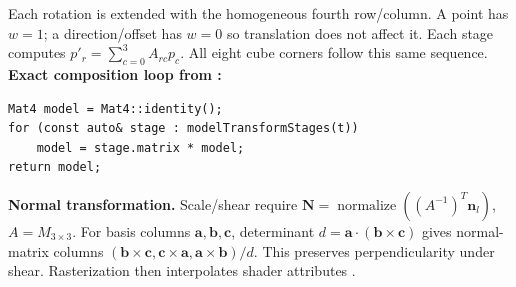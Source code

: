 Each rotation is extended with the homogeneous fourth row/column. A point has $w=1$; a direction/offset has $w=0$ so translation does not affect it. Each stage computes $p'_r=\sum_{c=0}^{3} A_{rc}p_c$. All eight cube corners follow this same sequence.
\textbf{Exact composition loop from :}
\begin{verbatim}
Mat4 model = Mat4::identity();
for (const auto& stage : modelTransformStages(t))
    model = stage.matrix * model;
return model;
\end{verbatim}
\textbf{Normal transformation.} Scale/shear require $\mathbf N=\operatorname{normalize}((A^{-1})^T\mathbf n_l)$, $A=M_{3\times3}$. For basis columns $\mathbf a,\mathbf b,\mathbf c$, determinant $d=\mathbf a\cdot(\mathbf b\times\mathbf c)$ gives normal-matrix columns $(\mathbf b\times\mathbf c,\mathbf c\times\mathbf a,\mathbf a\times\mathbf b)/d$. This preserves perpendicularity under shear. Rasterization then interpolates shader attributes \cite{opengl}.
